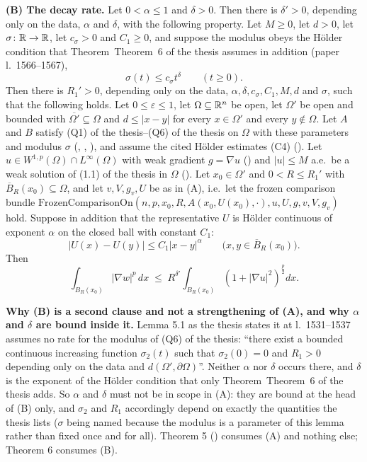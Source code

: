 \begin{lemma}
\medskip
\noindent\textbf{(B) The decay rate.}  Let $0<\alpha\le1$ and $\delta>0$.  Then
there is $\delta'>0$, depending only on the data, $\alpha$ and $\delta$, with
the following property.  Let $M\ge0$, let $d>0$, let $\sigma\colon\mathbb{R}\to\mathbb{R}$, let
$c_\sigma>0$ and $C_1\ge0$, and suppose the modulus obeys the H\"older
condition that Theorem~Theorem~6 of the thesis assumes in addition (paper l.~1566--1567),
\[
\sigma(t)\le c_\sigma t^{\delta}\qquad(t\ge0).
\]
Then there is $R_1'>0$, depending only on the data,
$\alpha,\delta,c_\sigma,C_1,M,d$ and $\sigma$, such that the following holds.
Let $0\le\varepsilon\le1$, let $\Omega\subseteq\mathbb{R}^n$ be open, let $\Omega'$ be
open and bounded with $\overline{\Omega'}\subseteq\Omega$ and $d\le|x-y|$ for
every $x\in\Omega'$ and every $y\notin\Omega$.  Let $A$ and $B$ satisfy
(Q1) of the thesis--(Q6) of the thesis on $\Omega$ with these parameters and modulus
$\sigma$ (, ,
), and assume the cited H\"older estimates (C4)
().  Let
$u\in W^{1,p}(\Omega)\cap L^\infty(\Omega)$ with weak gradient $g=\nabla u$
() and $|u|\le M$ a.e.\ be a weak solution of (1.1) of the thesis
in $\Omega$ ().  Let $x_0\in\Omega'$ and
$0<R\le R_1'$ with $\overline B_R(x_0)\subseteq\Omega$, and let $v,V,g_v,U$ be
as in (A), i.e.\ let the frozen comparison bundle
$\mathrm{FrozenComparisonOn}(n,p,x_0,R,A(x_0,U(x_0),\cdot),u,U,g,v,V,g_v)$ hold.
Suppose in addition that the representative $U$ is H\"older continuous of
exponent $\alpha$ on the closed ball with constant $C_1$:
\[
|U(x)-U(y)|\le C_1|x-y|^{\alpha}
\qquad\bigl(x,y\in\overline B_R(x_0)\bigr).
\]
Then
\[
\int_{B_R(x_0)}|\nabla w|^p\,dx\;\le\;R^{\delta'}\int_{B_R(x_0)}(1+|\nabla u|^2)^{\frac p2}dx .
\]

\medskip
\noindent\textbf{Why (B) is a second clause and not a strengthening of (A), and
why $\alpha$ and $\delta$ are bound inside it.}  Lemma 5.1 as the thesis states
it at l.~1531--1537 assumes no rate for the modulus of (Q6) of the thesis: ``there
exist a bounded continuous increasing function $\sigma_2(t)$ such that
$\sigma_2(0)=0$ and $R_1>0$ depending only on the data and
$d(\Omega',\partial\Omega)$''.  Neither $\alpha$ nor $\delta$ occurs there, and
$\delta$ is the exponent of the H\"older condition that only
Theorem~Theorem~6 of the thesis adds.  So $\alpha$ and $\delta$ must not be in scope in
(A): they are bound at the head of (B) only, and $\sigma_2$ and $R_1$
accordingly depend on exactly the quantities the thesis lists ($\sigma$ being
named because the modulus is a parameter of this lemma rather than fixed once
and for all).  Theorem 5 () consumes (A) and
nothing else; Theorem 6 consumes (B).


\end{lemma}
